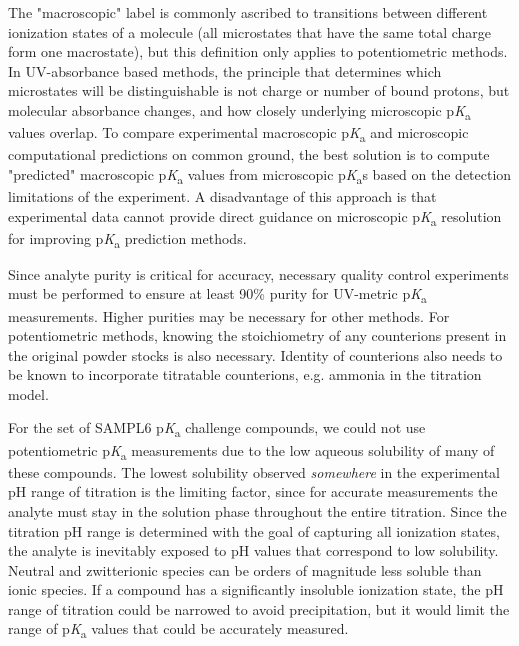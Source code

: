 \documentclass[9pt,lineno]{elife}
\newcommand{\pKa}{p\textit{K}\textsubscript{a}}
\begin{document}
The "macroscopic" label is commonly ascribed to transitions between different ionization states of a molecule (all microstates that have the same total charge form one macrostate), but this definition only applies to potentiometric methods. 
In UV-absorbance based methods, the principle that determines which microstates will be distinguishable is not charge or number of bound protons, but molecular absorbance changes, and how closely underlying microscopic \pKa{} values overlap. 
To compare experimental macroscopic \pKa{} and microscopic computational predictions on common ground, the best solution is to compute "predicted" macroscopic \pKa{} values from microscopic \pKa{}s based on the detection limitations of the experiment. 
A disadvantage of this approach is that experimental data cannot provide direct guidance on microscopic \pKa{} resolution for improving \pKa{} prediction methods.

Since analyte purity is critical for accuracy, necessary quality control experiments must be performed to ensure at least 90\% purity for UV-metric \pKa{} measurements. 
Higher purities may be necessary for other methods. 
For potentiometric methods, knowing the stoichiometry of any counterions present in the original powder stocks is also necessary. Identity of counterions also needs to be known to incorporate titratable counterions, e.g. ammonia in the titration model. 


For the set of SAMPL6 \pKa{} challenge compounds, we could not use potentiometric \pKa{} measurements due to the low aqueous solubility of many of these compounds. 
The lowest solubility observed \emph{somewhere} in the experimental pH range of titration is the limiting factor, since for accurate measurements the analyte must stay in the solution phase throughout the entire titration. 
Since the titration pH range is determined with the goal of capturing all ionization states, the analyte is inevitably exposed to pH values that correspond to low solubility. 
Neutral and zwitterionic species can be orders of magnitude less soluble than ionic species. If a compound has a significantly insoluble ionization state, the pH range of titration could be narrowed to avoid  precipitation, but it would limit the range of \pKa{} values that could be accurately measured.
\end{document}
